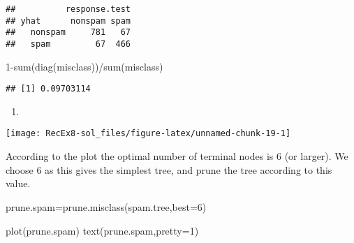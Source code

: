 \documentclass[
]{article}
\newenvironment{Shaded}{\begin{snugshade}}{\end{snugshade}}
\newcommand{\AttributeTok}[1]{\textcolor[rgb]{0.77,0.63,0.00}{#1}}
\newcommand{\DecValTok}[1]{\textcolor[rgb]{0.00,0.00,0.81}{#1}}
\newcommand{\FunctionTok}[1]{\textcolor[rgb]{0.00,0.00,0.00}{#1}}
\newcommand{\NormalTok}[1]{#1}
\newcommand{\OtherTok}[1]{\textcolor[rgb]{0.56,0.35,0.01}{#1}}
\newcommand{\SpecialCharTok}[1]{\textcolor[rgb]{0.00,0.00,0.00}{#1}}
\newcommand{\StringTok}[1]{\textcolor[rgb]{0.31,0.60,0.02}{#1}}
\providecommand{\tightlist}{%
  \setlength{\itemsep}{0pt}\setlength{\parskip}{0pt}}
\begin{document}
\begin{verbatim}
##          response.test
## yhat      nonspam spam
##   nonspam     781   67
##   spam         67  466
\end{verbatim}

\begin{Shaded}
\begin{Highlighting}[]
\DecValTok{1}\SpecialCharTok{{-}}\FunctionTok{sum}\NormalTok{(}\FunctionTok{diag}\NormalTok{(misclass))}\SpecialCharTok{/}\FunctionTok{sum}\NormalTok{(misclass)}
\end{Highlighting}
\end{Shaded}

\begin{verbatim}
## [1] 0.09703114
\end{verbatim}

\begin{enumerate}
\def\labelenumi{\alph{enumi})}
\setcounter{enumi}{4}
\tightlist
\item
\end{enumerate}

\begin{Shaded}
\end{Shaded}

\texttt{[image: RecEx8-sol\_files/figure-latex/unnamed-chunk-19-1]}

According to the plot the optimal number of terminal nodes is 6 (or
larger). We choose 6 as this gives the simplest tree, and prune the tree
according to this value.

\begin{Shaded}
\begin{Highlighting}[]
\NormalTok{prune.spam}\OtherTok{=}\FunctionTok{prune.misclass}\NormalTok{(spam.tree,}\AttributeTok{best=}\DecValTok{6}\NormalTok{)}

\FunctionTok{plot}\NormalTok{(prune.spam)}
\FunctionTok{text}\NormalTok{(prune.spam,}\AttributeTok{pretty=}\DecValTok{1}\NormalTok{)}
\end{Highlighting}
\end{Shaded}
\end{document}
